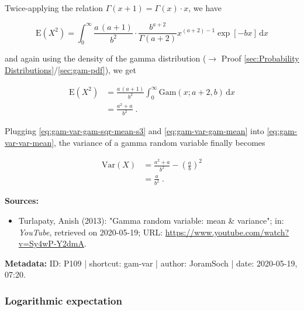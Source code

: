 \documentclass[a4paper,12pt,twoside]{book}
\begin{document}
Twice-applying the relation $\Gamma(x+1) = \Gamma(x) \cdot x$, we have

\begin{equation} \label{eq:gam-var-gam-sqr-mean-s2}
\mathrm{E}(X^2) = \int_{0}^{\infty} \frac{a \, (a+1)}{b^2} \cdot \frac{b^{a+2}}{\Gamma(a+2)} x^{(a+2)-1} \exp[-b x] \, \mathrm{d}x
\end{equation}

and again using the density of the gamma distribution ($\rightarrow$ Proof \ref{sec:Probability Distributions}/\ref{sec:gam-pdf}), we get

\begin{equation} \label{eq:gam-var-gam-sqr-mean-s3}
\begin{split}
\mathrm{E}(X^2) &= \frac{a \, (a+1)}{b^2} \int_{0}^{\infty} \mathrm{Gam}(x; a+2, b) \, \mathrm{d}x \\
&= \frac{a^2+a}{b^2} \; .
\end{split}
\end{equation}

Plugging \eqref{eq:gam-var-gam-sqr-mean-s3} and \eqref{eq:gam-var-gam-mean} into \eqref{eq:gam-var-var-mean}, the variance of a gamma random variable finally becomes

\begin{equation} \label{eq:gam-var-gam-var-qed}
\begin{split}
\mathrm{Var}(X) &= \frac{a^2+a}{b^2} - \left( \frac{a}{b} \right)^2 \\
&= \frac{a}{b^2} \; .
\end{split}
\end{equation}


\vspace{1em}
\textbf{Sources:}
\begin{itemize}
\item Turlapaty, Anish (2013): "Gamma random variable: mean \& variance"; in: \textit{YouTube}, retrieved on 2020-05-19; URL: \url{https://www.youtube.com/watch?v=Sy4wP-Y2dmA}.
\end{itemize}


\vspace{1em}
\textbf{Metadata:} ID: P109 | shortcut: gam-var | author: JoramSoch | date: 2020-05-19, 07:20.
\vspace{1em}



\subsubsection[\textbf{Logarithmic expectation}]{Logarithmic expectation} \label{sec:gam-logmean}
\setcounter{equation}{0}
\end{document}
